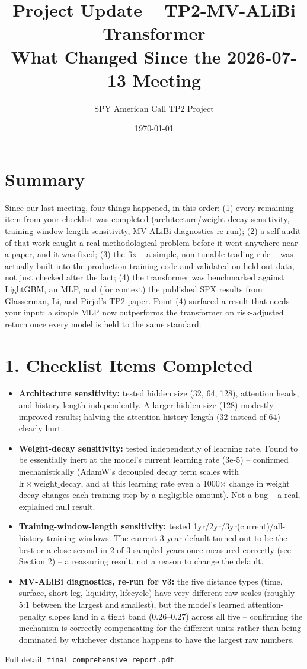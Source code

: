 \documentclass[11pt]{article}
\title{Project Update -- TP2-MV-ALiBi Transformer\\\large What Changed Since the 2026-07-13 Meeting}
\author{SPY American Call TP2 Project}
\date{\today}
\begin{document}
\sloppy
\maketitle

\section*{Summary}
Since our last meeting, four things happened, in this order: (1) every remaining item from your checklist
was completed (architecture/weight-decay sensitivity, training-window-length sensitivity, MV-ALiBi
diagnostics re-run); (2) a self-audit of that work caught a real methodological problem before it went
anywhere near a paper, and it was fixed; (3) the fix -- a simple, non-tunable trading rule -- was actually
built into the production training code and validated on held-out data, not just checked after the fact;
(4) the transformer was benchmarked against LightGBM, an MLP, and (for context) the published SPX results
from Glasserman, Li, and Pirjol's TP2 paper. Point (4) surfaced a result that needs your input: a simple
MLP now outperforms the transformer on risk-adjusted return once every model is held to the same standard.

\section*{1. Checklist Items Completed}
\begin{itemize}
\item \textbf{Architecture sensitivity:} tested hidden size (32, 64, 128), attention heads, and history
length independently. A larger hidden size (128) modestly improved results; halving the attention history
length (32 instead of 64) clearly hurt.
\item \textbf{Weight-decay sensitivity:} tested independently of learning rate. Found to be essentially
inert at the model's current learning rate (3e-5) -- confirmed mechanistically (AdamW's decoupled decay term
scales with $\mathrm{lr}\times\mathrm{weight\_decay}$, and at this learning rate even a 1000$\times$ change in
weight decay changes each training step by a negligible amount). Not a bug -- a real, explained null result.
\item \textbf{Training-window-length sensitivity:} tested 1yr/2yr/3yr(current)/all-history training windows.
The current 3-year default turned out to be the best or a close second in 2 of 3 sampled years once measured
correctly (see Section 2) -- a reassuring result, not a reason to change the default.
\item \textbf{MV-ALiBi diagnostics, re-run for v3:} the five distance types (time, surface, short-leg,
liquidity, lifecycle) have very different raw scales (roughly 5:1 between the largest and smallest), but the
model's learned attention-penalty slopes land in a tight band (0.26--0.27) across all five -- confirming the
mechanism is correctly compensating for the different units rather than being dominated by whichever
distance happens to have the largest raw numbers.
\end{itemize}
Full detail: \texttt{final\_comprehensive\_report.pdf}.
\end{document}
